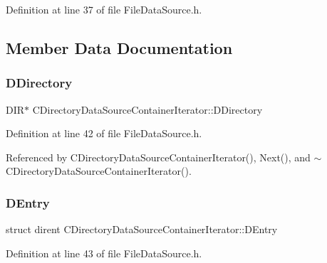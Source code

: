 Definition at line 37 of file File\+Data\+Source.\+h.



\subsection{Member Data Documentation}
\hypertarget{classCDirectoryDataSourceContainerIterator_a0e07044b1a916e3dd931ae0778317e16}{}\label{classCDirectoryDataSourceContainerIterator_a0e07044b1a916e3dd931ae0778317e16} 
\subsubsection{\texorpdfstring{D\+Directory}{DDirectory}}
{\footnotesize\ttfamily D\+IR$\ast$ C\+Directory\+Data\+Source\+Container\+Iterator\+::\+D\+Directory\hspace{0.3cm}{\ttfamily [protected]}}



Definition at line 42 of file File\+Data\+Source.\+h.



Referenced by C\+Directory\+Data\+Source\+Container\+Iterator(), Next(), and $\sim$\+C\+Directory\+Data\+Source\+Container\+Iterator().

\hypertarget{classCDirectoryDataSourceContainerIterator_a69dfb8a9f2ab7f71e7d106d4d6c0e29b}{}\label{classCDirectoryDataSourceContainerIterator_a69dfb8a9f2ab7f71e7d106d4d6c0e29b} 
\subsubsection{\texorpdfstring{D\+Entry}{DEntry}}
{\footnotesize\ttfamily struct dirent C\+Directory\+Data\+Source\+Container\+Iterator\+::\+D\+Entry\hspace{0.3cm}{\ttfamily [protected]}}



Definition at line 43 of file File\+Data\+Source.\+h.



